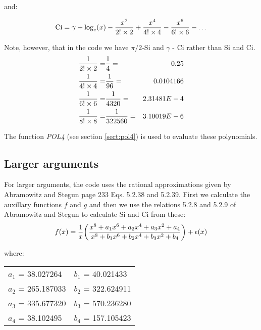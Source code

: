\noindent and:

\begin{equation}
\mathrm{Ci} = \gamma + \log_e(x) - {x^2 \over 2! \times 2} +
{x^4 \over 4! \times 4} - {x^6 \over 6! \times 6} - \ldots
\end{equation}

\noindent Note, however, that in the code we have $\pi/2$-Si and $\gamma$ - Ci
rather than Si and Ci.\\

\begin{eqnarray*}
{1 \over 2! \times 2} =& {1 \over 4}      =& 0.25\\
{1 \over 4! \times 4} =& {1 \over 96}     =& 0.0104166\\
{1 \over 6! \times 6} =& {1 \over 4320}   =& 2.31481E-4\\
{1 \over 8! \times 8} =& {1 \over 322560} =& 3.10019E-6
\end{eqnarray*}

\noindent The function {\em POL4} (see section \ref{sect:pol4}) is used to
evaluate these polynomials.\\

\subsection{Larger arguments}

\noindent For larger arguments, the code uses the rational
approximations given by Abramowitz and Stegun page 233 Eqs. 5.2.38 and
5.2.39. First we calculate the auxillary functions $f$ and $g$ and
then we use the relations 5.2.8 and 5.2.9 of Abramowitz and Stegun to
calculate Si and Ci from these:\\

\begin{equation}
f(x) = {1 \over x}
\bigg({x^8 + a_1 x^6 + a_2 x^4 + a_3 x^2 + a_4 \over x^8 + b_1 x^6 + b_2 x^4 + b_3 x^2 + b_4}\bigg)
+ \epsilon(x)
\end{equation}

\noindent where:\\

\begin{center}
\begin{tabular}{|ll|}
\hline
$a_1$ = 38.027264 & $b_1$ = 40.021433\\
$a_2$ = 265.187033 & $b_2$ = 322.624911\\
$a_3$ = 335.677320 & $b_3$ = 570.236280\\
$a_4$ = 38.102495 & $b_4$ = 157.105423\\
\hline
\end{tabular}
\end{center}

